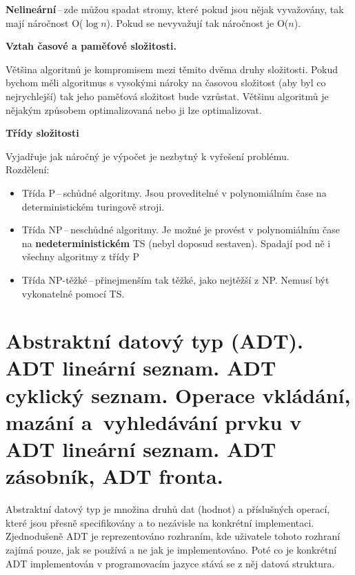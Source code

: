 \textbf{Nelineární}\,--\,zde můžou spadat stromy, které pokud jsou nějak vyvažovány, tak mají náročnost O($\log{n}$). Pokud se nevyvažují tak náročnost je O($n$).

\begin{Large}\vspace{0,5cm} \textbf{Vztah časové a paměťové složitosti.}
\end{Large}

Většina algoritmů je kompromisem mezi těmito dvěma druhy složitosti. Pokud bychom měli algoritmus s vysokými nároky na časovou složitost (aby byl co nejrychlejší) tak jeho paměťová složitost bude vzrůstat. Většinu algoritmů je nějakým způsobem optimalizovaná nebo ji lze optimalizovat.

\newpage

\begin{Large}\vspace{0,5cm} \textbf{Třídy složitosti}
\end{Large}

Vyjadřuje jak náročný je výpočet je nezbytný k vyřešení problému.\\
Rozdělení:
\begin{itemize}
    \item Třída P\,--\,schůdné algoritmy. Jsou proveditelné v polynomiálním čase na deterministickém turingově stroji.
    \item Třída NP\,--\,neschůdné algoritmy. Je možné je provést v polynomiálním čase na \textbf{nedeterministickém} TS (nebyl doposud sestaven). Spadají pod ně i všechny algoritmy z třídy P
    \item Třída NP-těžké\,--\,přinejmenším tak těžké, jako nejtěžší z NP. Nemusí být vykonatelné pomocí TS.
\end{itemize}









\newpage
\section{Abstraktní datový typ (ADT). ADT lineární seznam. ADT cyklický seznam. Operace vkládání, mazání a~vyhledávání prvku v ADT lineární seznam. ADT zásobník, ADT fronta.}

Abstraktní datový typ je množina druhů dat (hodnot) a příslušných operací, které jsou přesně specifikovány a to nezávisle na konkrétní implementaci. Zjednodušeně ADT je reprezentováno rozhraním, kde uživatele tohoto rozhraní zajímá pouze, jak se používá a ne jak je implementováno. Poté co je konkrétní ADT implementován v programovacím jazyce stává se z něj datová struktura.


